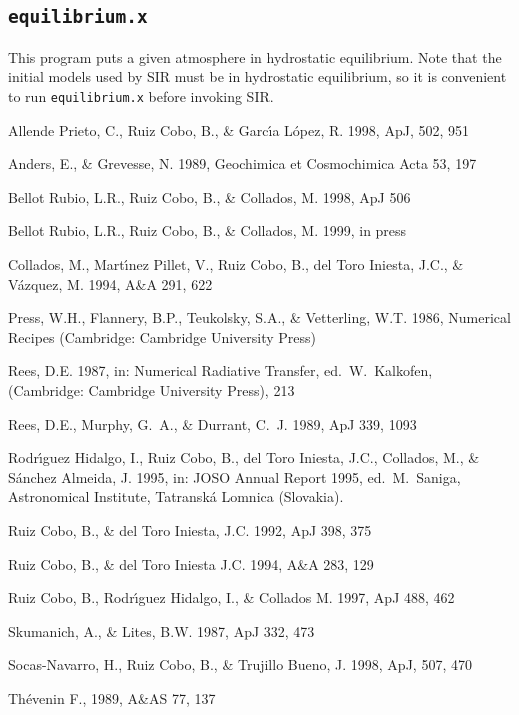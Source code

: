 \subsection{{\tt equilibrium.x}}
This program puts a given atmosphere in hydrostatic equilibrium. Note
that the initial models used by SIR must be in hydrostatic equilibrium, so
it is convenient to run {\tt equilibrium.x} before invoking SIR. 


\begin{thebibliography}{99}

\bibitem{} Allende Prieto, C., Ruiz Cobo, B., \& Garc\'{\i}a L\'opez, R. 1998, ApJ, 502, 951

\bibitem{} Anders, E., \& Grevesse, N. 1989, Geochimica et Cosmochimica Acta 53, 197 

\bibitem{} Bellot Rubio, L.R., Ruiz Cobo, B., \& Collados, M. 1998, ApJ 506

\bibitem{} Bellot Rubio, L.R., Ruiz Cobo, B., \& Collados, M. 1999, in press

\bibitem{} Collados, M., Mart\'{\i}nez Pillet, V., Ruiz Cobo, B., del Toro Iniesta, J.C., 
\& V\'azquez, M. 1994, A\&A 291, 622 

\bibitem{} Press, W.H., Flannery, B.P., Teukolsky, S.A., \& Vetterling, W.T.
1986, Numerical Recipes (Cambridge:  Cambridge University Press)

\bibitem{} Rees, D.E. 1987, in: Numerical Radiative Transfer, ed.\ W.\ Kalkofen, (Cambridge: Cambridge University Press), 213

\bibitem{} Rees, D.E., Murphy, G.\ A., \& Durrant, C.\ J. 1989, ApJ 339, 1093

\bibitem{} Rodr\'{\i}guez Hidalgo, I., Ruiz Cobo, B., del Toro Iniesta, J.C.,
Collados, M., \& S\'anchez Almeida, J. 1995, in: JOSO Annual Report
1995, ed.\ M.\ Saniga, Astronomical Institute, Tatransk\'a Lomnica
(Slovakia).

\bibitem{} Ruiz Cobo, B., \&  del Toro Iniesta, J.C. 1992, ApJ  398, 375

\bibitem{} Ruiz Cobo, B., \& del Toro Iniesta J.C. 1994, A\&A 283, 129

\bibitem{} Ruiz Cobo, B., Rodr\'{\i}guez Hidalgo, I., \& Collados M. 1997, ApJ 488, 462

\bibitem{} Skumanich, A., \& Lites, B.W. 1987, ApJ 332, 473

\bibitem{} Socas-Navarro, H., Ruiz Cobo, B., \& Trujillo Bueno, J. 1998, ApJ, 507, 470

 Th\'evenin F., 1989, A\&AS 77, 137


\end{thebibliography}

